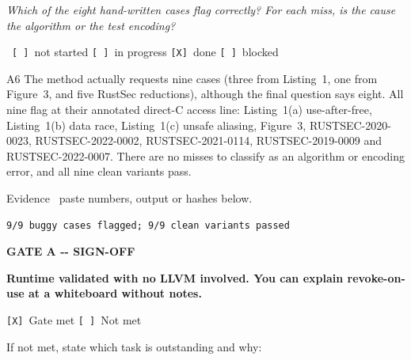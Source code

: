 \documentclass[11pt,a4paper]{article}
\newcommand{\lbl}[1]{\vspace{5pt}\noindent{\scriptsize\bfseries\color{mute}\MakeUppercase{#1}}\par\vspace{1pt}}
\begin{document}
\lbl{You will be asked}
\begin{askbox}
\emph{Which of the eight hand-written cases flag correctly? For each miss, is the cause the algorithm or the test encoding?}
\end{askbox}
\ \texttt{[\ ]}~not started \quad
  \texttt{[\ ]}~in progress \quad \texttt{[X]}~done \quad \texttt{[\ ]}~blocked\par\vspace{3pt}
\begin{answerbox}{A6}
The method actually requests nine cases (three from Listing~1, one from
Figure~3, and five RustSec reductions), although the final question says
eight. All nine flag at their annotated direct-C access line: Listing~1(a)
use-after-free, Listing~1(b) data race, Listing~1(c) unsafe aliasing, Figure~3,
RUSTSEC-2020-0023, RUSTSEC-2022-0002, RUSTSEC-2021-0114,
RUSTSEC-2019-0009 and RUSTSEC-2022-0007. There are no misses to classify as an
algorithm or encoding error, and all nine clean variants pass.

{\scriptsize\color{mute}Evidence \textemdash\ paste numbers, output or hashes below.}
\begin{verbatim}
9/9 buggy cases flagged; 9/9 clean variants passed
\end{verbatim}
\end{answerbox}

\vspace{10pt}

\begin{gatebox}

{\scriptsize\bfseries\color{mute}GATE A -{}- SIGN-OFF}\par\vspace{3pt}

{\bfseries Runtime validated with no LLVM involved. You can explain revoke-on-use at a whiteboard without notes.}\par\vspace{5pt}

\texttt{[X]}~Gate met \qquad \texttt{[\ ]}~Not met\par\vspace{4pt}

{\scriptsize\color{mute}If not met, state which task is outstanding and why:}

\begin{verbatim}

\end{verbatim}

\end{gatebox}
\end{document}
